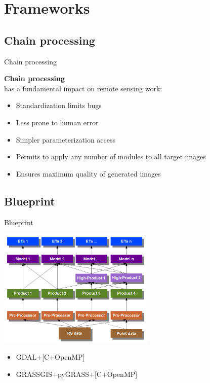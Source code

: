 \documentclass[aspectratio=169,unknownkeysallowed,xcolor=dvipsnames,beamer]{beamer} %
\begin{document}
\section{Frameworks}
\subsection{Chain processing}
\begin{frame}[fragile]{Chain processing}

\textbf{Chain processing}\\
 has a fundamental impact on remote sensing work:\newline\linebreak

\begin{itemize}
 \item Standardization limits bugs
 \item Less prone to human error
 \item Simpler parameterization access
 \item Permits to apply any number of modules to all target images
 \item Ensures maximum quality of generated images
\end{itemize}
\end{frame}

\subsection{Blueprint}
\begin{frame}[fragile]{Blueprint}

\begin{center}
 \includegraphics[width=7.5cm]{chain0}
\end{center}

\begin{itemize}
 \item GDAL+[C+OpenMP]
 \item GRASSGIS+pyGRASS+[C+OpenMP]
\end{itemize}
\end{frame}
\end{document}
